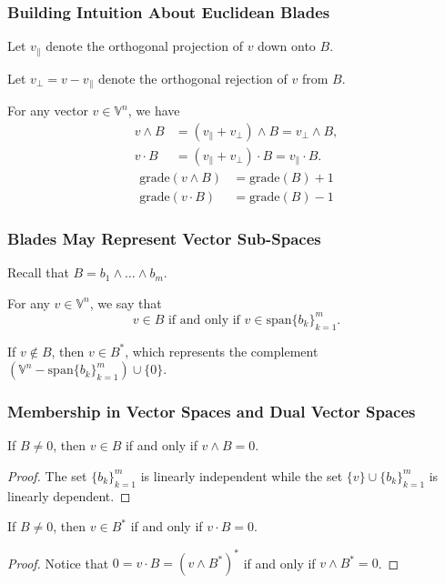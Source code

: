 \documentclass{beamer}
\newcommand{\V}{\mathbb{V}}
\newcommand{\grade}{\mbox{grade}}
\begin{document}
\begin{frame}
\frametitle{Building Intuition About Euclidean Blades}
Let $v_{\parallel}$ denote the orthogonal \alert{projection} of $v$ down onto $B$.

Let $v_{\perp}=v-v_{\parallel}$ denote the orthogonal \alert{rejection} of $v$ from $B$.

For any vector $v\in\V^n$, we have
\begin{align*}
v\wedge B &= (v_{\parallel} + v_{\perp})\wedge B = v_{\perp}\wedge B, \\
v\cdot B &= (v_{\parallel} + v_{\perp})\cdot B = v_{\parallel}\cdot B.
\end{align*}
\begin{align*}
\grade(v\wedge B) &= \grade(B) + 1 \\
\grade(v\cdot B) &= \grade(B) - 1
\end{align*}
\end{frame}

\begin{frame}
\frametitle{Blades May Represent Vector Sub-Spaces}
Recall that $B = b_1\wedge\dots\wedge b_m$.
\begin{definition}
For any $v\in\V^n$, we say that
\begin{equation*}
\mbox{$v\in B$ if and only if $v\in\mbox{span}\{b_k\}_{k=1}^m$}.
\end{equation*}
\end{definition}
\begin{definition}
If $v\not\in B$, then $v\in B^*$, which represents the complement $(\V^n-\mbox{span}\{b_k\}_{k=1}^m)\cup\{0\}$.
\end{definition}
\end{frame}

\begin{frame}
\frametitle{Membership in Vector Spaces and Dual Vector Spaces}
If $B\neq 0$, then $v\in B$ if and only if $v\wedge B=0$.
\begin{proof}
The set $\{b_k\}_{k=1}^m$ is linearly independent while the set $\{v\}\cup\{b_k\}_{k=1}^m$ is linearly dependent.
\end{proof}
If $B\neq 0$, then $v\in B^*$ if and only if $v\cdot B=0$.
\begin{proof}
Notice that $0=v\cdot B=(v\wedge B^*)^*$ if and only if $v\wedge B^*=0$.
\end{proof}
\end{frame}
\end{document}
